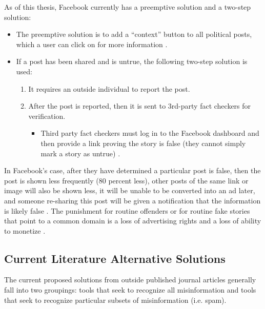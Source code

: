 \documentclass[preprint,review,12pt]{elsarticle}
\begin{document}
As of this thesis, Facebook currently has a preemptive solution and a two-step solution:
\renewcommand{\labelenumii}{\Roman{enumii}}
\begin{itemize}
\item The preemptive solution is to add a ``context” button to all political posts, which a user can click on for more information \cite{smith2018designing}.
 \item If a post has been shared and is untrue, the following two-step solution is used:
 \begin{enumerate}
     \item It requires an outside individual to report the post. 
     \item After the post is reported, then it is  sent to 3rd-party fact checkers for verification. 
     \begin{itemize}
     \item Third party fact checkers must log in to the Facebook dashboard and then provide a link proving the story is false (they cannot simply mark a story as untrue) \cite{owen2016clamping}.
     \end{itemize}
 \end{enumerate}
 \end{itemize}
 
 In Facebook’s case, after they have determined a particular post is false, then the post is shown less frequently (80 percent less), other posts of the same link or image will also be shown less, it will be unable to be converted into an ad later, and someone re-sharing this post will be given a notification that the information is likely false \cite{owen2016clamping,facebook2020fact}. The punishment for routine offenders or for routine fake stories that point to a common domain is a loss of advertising rights and a loss of ability to monetize \cite{facebook2020fact}.
 
 \subsection{Current Literature Alternative Solutions}
 \label{sec: literature review}
 The current proposed solutions from outside published journal articles generally fall into two groupings: tools that seek to recognize all misinformation and tools that seek to recognize particular subsets of misinformation (i.e. spam).
\end{document}
